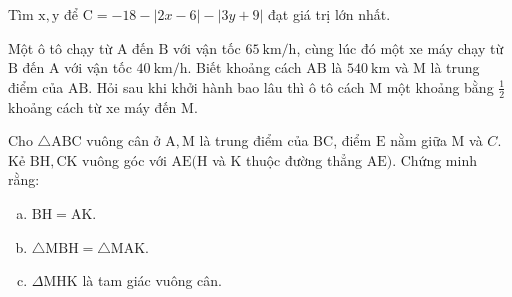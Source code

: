 \begin{bt} 
	Tìm $\mathrm{x}, \mathrm{y}$ để $\mathrm{C}=-18-|2 x-6|-|3 y+9|$ đạt giá trị lớn nhất.
	\loigiai{}
\end{bt}

\begin{bt} 
	Một ô tô chạy từ $\mathrm{A}$ đến $\mathrm{B}$ với vận tốc $65 \mathrm{~km} / \mathrm{h}$, cùng lúc đó một xe máy chạy từ $\mathrm{B}$ đến $\mathrm{A}$ với vận tốc $40 \mathrm{~km} / \mathrm{h}$. Biết khoảng cách $\mathrm{AB}$ là $540 \mathrm{~km}$ và $\mathrm{M}$ là trung điểm của $\mathrm{AB}$. Hỏi sau khi khởi hành bao lâu thì ô tô cách $\mathrm{M}$ một khoảng bằng $\frac{1}{2}$ khoảng cách từ xe máy đến M.
	\loigiai{}
\end{bt}

\begin{bt}
	Cho $\triangle \mathrm{ABC}$ vuông cân ở $\mathrm{A}, \mathrm{M}$ là trung điểm của $\mathrm{BC}$, điểm $\mathrm{E}$ nằm giữa $\mathrm{M}$ và $C$. Kẻ $\mathrm{BH}, \mathrm{CK}$ vuông góc với $\mathrm{AE}(\mathrm{H}$ và $\mathrm{K}$ thuộc đường thẳng $\mathrm{AE})$. Chứng minh rằng:
	\begin{enumerate}[a.]
		\item $\mathrm{BH}=\mathrm{AK}$.
		\item $\triangle \mathrm{MBH}=\triangle \mathrm{MAK}$.
		\item $\Delta \mathrm{MHK}$ là tam giác vuông cân.
	\end{enumerate}
	\loigiai{}
\end{bt}
